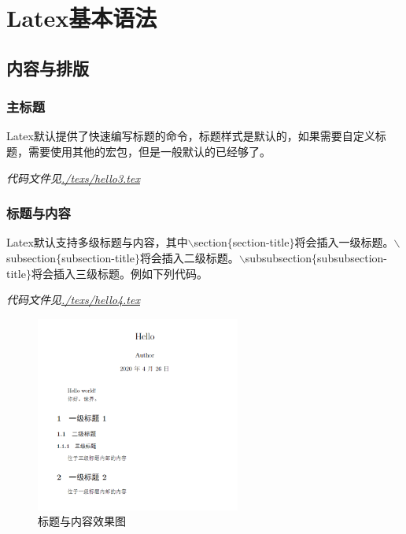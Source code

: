 \documentclass{article}
\begin{document}
    \section{Latex基本语法}
        \subsection{内容与排版}
            \subsubsection{主标题}
                Latex默认提供了快速编写标题的命令，标题样式是默认的，如果需要自定义标题，需要使用其他的宏包，但是一般默认的已经够了。

                
                \textit{代码文件见\url{./texs/hello3.tex}}

            \subsubsection{标题与内容}
                Latex默认支持多级标题与内容，其中$\backslash$section$\lbrace$section-title$\rbrace$将会插入一级标题。$\backslash$subsection$\lbrace$subsection-title$\rbrace$将会插入二级标题。$\backslash$subsubsection$\lbrace$subsubsection-title$\rbrace$将会插入三级标题。例如下列代码。

                
                \textit{代码文件见\url{./texs/hello4.tex}}

                \begin{figure}[H]
                    \centering
                    \includegraphics[width=0.6\textwidth]{snaps/snap2.png}
                    \caption{标题与内容效果图}
                    \label{snap2}
                \end{figure}
\end{document}
